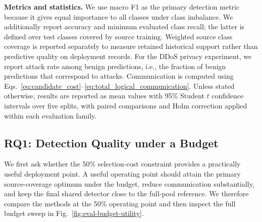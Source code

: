 \documentclass[conference]{IEEEtran}
\theoremstyle{definition}
\newcommand{\bheading}[1]{\noindent\textbf{#1.}\xspace}
\begin{document}
\bheading{Metrics and statistics}
We use macro F1 as the primary detection metric because it gives equal importance to all classes under class imbalance.
We additionally report accuracy and minimum evaluated class recall; the latter is defined over test classes covered by source training.
Weighted source class coverage is reported separately to measure retained historical support rather than predictive quality on deployment records.
For the DDoS privacy experiment, we report attack rate among benign predictions, i.e., the fraction of benign predictions that correspond to attacks.
Communication is computed using Eqs.~\ref{eq:candidate_cost}--\ref{eq:total_logical_communication}.
Unless stated otherwise, results are reported as mean values with 95\% Student $t$ confidence intervals over five splits, with paired comparisons and Holm correction applied within each evaluation family.


\subsection{RQ1: Detection Quality under a Budget}

We first ask whether the 50\% selection-cost constraint provides a practically useful deployment point.
A useful operating point should attain the primary source-coverage optimum under the budget, reduce communication substantially, and keep the final shared detector close to the full-pool reference.
We therefore compare the methods at the 50\% operating point and then inspect the full budget sweep in Fig.~\ref{fig:eval-budget-utility}.
\end{document}
